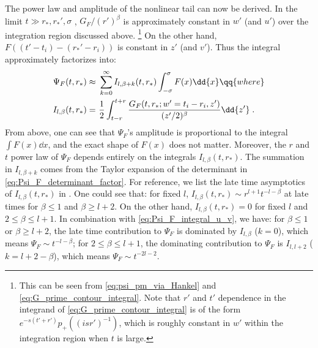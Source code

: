 The power law and amplitude of the nonlinear tail can now be derived.
In the limit $t \gg r_*, r_*', \sigma$ , $G_F / (r')^\beta$ is approximately constant in $w'$ (and $u'$) over the integration region discussed above.
\footnote{This can be seen from \eqref{eq:psi_pm_via_Hankel} and \eqref{eq:G_prime_contour_integral}.  Note that $r'$ and $t'$ dependence in the integrand of \eqref{eq:G_prime_contour_integral} is of the form $e^{-s (t' + r')} p_+((i s r')^{-1}) $, which is roughly constant in $w'$ within the integration region when $t$ is large.  } 
On the other hand, $F((t'-t_i)-(r_*'-r_i))$ is constant in $z'$ (and $v'$).
Thus the integral approximately factorizes into:
\begin{align}
  \label{eq:Psi_F_integral_u_v}
  \Psi_F(t,r_*)
  \approx \ & \sum_{k=0}^\infty I_{l,\beta+k}(t,r_*) \int_{-\sigma}^\sigma F(x) \dd{x} \qq{where} \nonumber \\
  I_{l,\beta}(t,r_*) = \ &  \frac12  \int_{t-r}^{t+r} \frac{G_F(t,r_*;w'=t_i-r_i, z')}{(z'/2)^\beta} \dd{z'} \;.
\end{align}
From above, one can see that $\Psi_F$'s amplitude is proportional to the integral $\int F(x) \dd{x}$, and the exact shape of $F(x)$ does not matter.
Moreover, the $r$ and $t$ power law of $\Psi_F$ depends entirely on the integrals $I_{l,\beta}(t,r_*)$.
The summation in $I_{l,\beta+k}$ comes from the Taylor expansion of the determinant in \eqref{eq:Psi_F_determinant_factor}.
For reference, we list the late time asymptotics of $I_{l,\beta}(t,r_*)$ in .
One could see that: for fixed $l$, $I_{l,\beta}(t,r_*) \sim r^{l+1} t^{-l-\beta}$ at late times for $\beta \leq 1$ and $\beta \geq l+2$.
On the other hand, $I_{l,\beta}(t,r_*) = 0$ for fixed $l$ and $2 \leq \beta \leq l+1$.
In combination with \eqref{eq:Psi_F_integral_u_v}, we have: for $\beta \leq 1$ or $\beta \geq l+2$, the late time contribution to $\Psi_F$ is dominated by $I_{l,\beta}$ ($k=0$), which means $\Psi_F \sim t^{-l-\beta}$; for $2 \leq \beta \leq l+1$, the dominating contribution to $\Psi_F$ is $I_{l,l+2}$ ($k=l+2-\beta$), which means $\Psi_F \sim t^{-2l-2}$.



